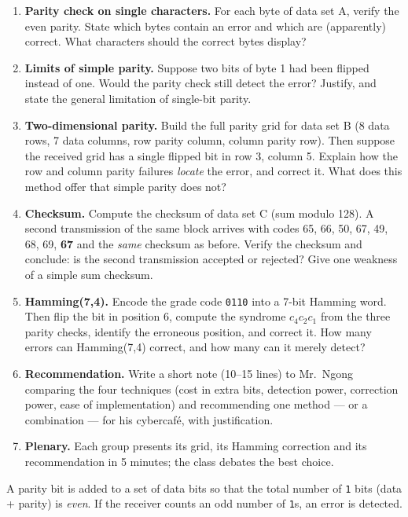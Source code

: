 \documentclass[11pt]{article}
\begin{document}
\begin{enumerate}
\item \textbf{Parity check on single characters.} For each byte of data set A, verify the even parity. State which bytes contain an error and which are (apparently) correct. What characters should the correct bytes display?
\item \textbf{Limits of simple parity.} Suppose two bits of byte 1 had been flipped instead of one. Would the parity check still detect the error? Justify, and state the general limitation of single-bit parity.
\item \textbf{Two-dimensional parity.} Build the full parity grid for data set B (8 data rows, 7 data columns, row parity column, column parity row). Then suppose the received grid has a single flipped bit in row 3, column 5. Explain how the row and column parity failures \emph{locate} the error, and correct it. What does this method offer that simple parity does not?
\item \textbf{Checksum.} Compute the checksum of data set C (sum modulo 128). A second transmission of the same block arrives with codes 65, 66, 50, 67, 49, 68, 69, \textbf{67} and the \emph{same} checksum as before. Verify the checksum and conclude: is the second transmission accepted or rejected? Give one weakness of a simple sum checksum.
\item \textbf{Hamming(7,4).} Encode the grade code \texttt{0110} into a 7-bit Hamming word. Then flip the bit in position 6, compute the syndrome $c_4c_2c_1$ from the three parity checks, identify the erroneous position, and correct it. How many errors can Hamming(7,4) correct, and how many can it merely detect?
\item \textbf{Recommendation.} Write a short note (10--15 lines) to Mr.\ Ngong comparing the four techniques (cost in extra bits, detection power, correction power, ease of implementation) and recommending one method --- or a combination --- for his cybercafé, with justification.
\item \textbf{Plenary.} Each group presents its grid, its Hamming correction and its recommendation in 5 minutes; the class debates the best choice.
\end{enumerate}

\begin{definition}
A parity bit is added to a set of data bits so that the total number of \texttt{1} bits (data + parity) is \emph{even}. If the receiver counts an odd number of \texttt{1}s, an error is detected.
\end{definition}
\end{document}
